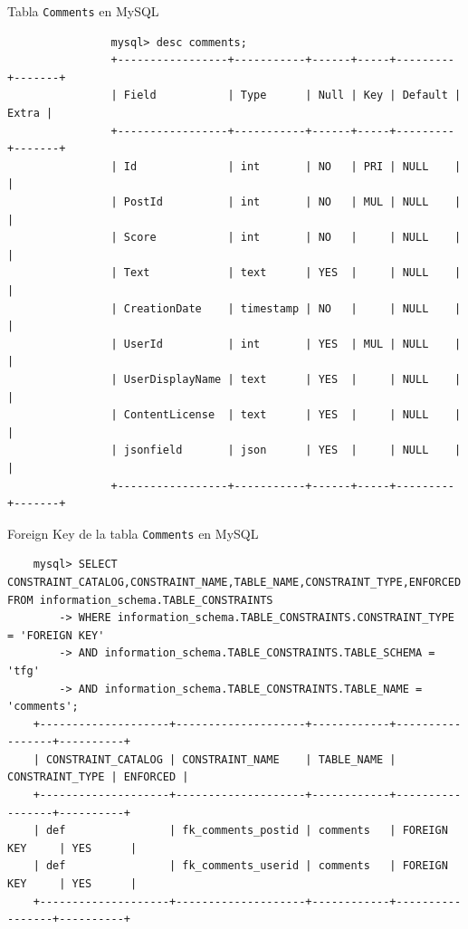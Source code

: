 \documentclass[a4paper, 12pt]{book}
\begin{document}
\begin{listing}[t]
    \caption{Tabla \texttt{Comments} en MySQL}{}
    \label{lst:4}
    \begin{verbatim}
                mysql> desc comments;
                +-----------------+-----------+------+-----+---------+-------+
                | Field           | Type      | Null | Key | Default | Extra |
                +-----------------+-----------+------+-----+---------+-------+
                | Id              | int       | NO   | PRI | NULL    |       |
                | PostId          | int       | NO   | MUL | NULL    |       |
                | Score           | int       | NO   |     | NULL    |       |
                | Text            | text      | YES  |     | NULL    |       |
                | CreationDate    | timestamp | NO   |     | NULL    |       |
                | UserId          | int       | YES  | MUL | NULL    |       |
                | UserDisplayName | text      | YES  |     | NULL    |       |
                | ContentLicense  | text      | YES  |     | NULL    |       |
                | jsonfield       | json      | YES  |     | NULL    |       |
                +-----------------+-----------+------+-----+---------+-------+
    \end{verbatim}
\end{listing}
\begin{listing}[t]
    \caption{Foreign Key de la tabla \texttt{Comments} en MySQL}{}
    \label{lst:5}
    \begin{verbatim}
    mysql> SELECT CONSTRAINT_CATALOG,CONSTRAINT_NAME,TABLE_NAME,CONSTRAINT_TYPE,ENFORCED FROM information_schema.TABLE_CONSTRAINTS
        -> WHERE information_schema.TABLE_CONSTRAINTS.CONSTRAINT_TYPE = 'FOREIGN KEY'
        -> AND information_schema.TABLE_CONSTRAINTS.TABLE_SCHEMA = 'tfg'
        -> AND information_schema.TABLE_CONSTRAINTS.TABLE_NAME = 'comments';
    +--------------------+--------------------+------------+-----------------+----------+
    | CONSTRAINT_CATALOG | CONSTRAINT_NAME    | TABLE_NAME | CONSTRAINT_TYPE | ENFORCED |
    +--------------------+--------------------+------------+-----------------+----------+
    | def                | fk_comments_postid | comments   | FOREIGN KEY     | YES      |
    | def                | fk_comments_userid | comments   | FOREIGN KEY     | YES      |
    +--------------------+--------------------+------------+-----------------+----------+
    \end{verbatim}
\end{listing}
\end{document}
